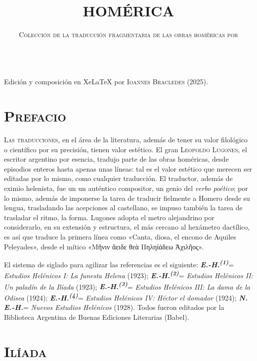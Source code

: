 \documentclass[11pt,twoside]{article}
\title{\huge\textbf{HOMÉRICA}}
\date{\vspace{40pt} \textsc{Colección de la traducción fragmentaria de las obras homéricas por}\\\vspace*{14pt}{\huge\textsc{\textbf{Leopoldo Lugones}}}\\\fontsize{40}{11}\selectfont{\vfill\textbf{\LaTeX}}}
\author{}
\newcommand{\ehuno}{\emph{\textbf{E.-H.\textsuperscript{(1)}}}}
\newcommand{\ehdos}{\emph{\textbf{E.-H.\textsuperscript{(2)}}}}
\newcommand{\ehter}{\emph{\textbf{E.-H.\textsuperscript{(3)}}}}
\newcommand{\ehctr}{\emph{\textbf{E.-H.\textsuperscript{(4)}}}}
\newcommand{\neh}{\emph{\textbf{N. E.-H.}}}
\begin{document}
{
	\maketitle
	}
\newpage
%
\null
\vfill
\begin{flushright}
	Edición y composición en XeLaTeX por \textsc{Ioannes Bracledes} (2025).
\end{flushright}
\newpage
%
\tableofcontents
\newpage
%
\setcounter{page}{1}
\section*{\centering\textsc{Prefacio}}
\par
%
\textsc{Las traducciones}, en el área de la literatura, además de tener su valor filológico o científico por su precisión, tienen valor estético. El gran \textsc{Leopoldo Lugones}, el escritor argentino por esencia, tradujo parte de las obras homéricas, desde episodios enteros hasta apenas unas líneas: tal es el valor estético que merecen ser editadas por lo mismo, como cualquier traducción. El traductor, además de eximio helenista, fue un un auténtico compositor, un genio del \emph{verbo poético}; por lo mismo, además de imponerse la tarea de traducir fielmente a Homero desde su lengua, trasladando las acepciones al castellano, se impuso también la tarea de trasladar el ritmo, la forma. Lugones adopta el metro alejandrino por considerarlo, en su extensión y estructura, el más cercano al hexámetro dactílico, es así que traduce la primera línea como «Canta, diosa, el encono de Aquiles Peleyades», desde el mítico «Μῆνιν ἄειδε θεὰ Πηληϊάδεω Ἀχιλῆος».\par
%
El sistema de siglado para agilizar las referencias es el siguiente: \ehuno = \emph{Estudios Helénicos I: La funesta Helena} (1923); \ehdos = \emph{Estudios Helénicos II: Un paladín de la Ilíada} (1923); \ehter = \emph{Estudios Helénicos III: La dama de la Odisea} (1924); \ehctr = \emph{Estudios Helénicos IV: Héctor el domador} (1924); \neh = \emph{Nuevos Estudios Helénicos} (1928). Todos fueron editados por la Biblioteca Argentina de Buenas Ediciones Literarias (Babel).\par
\newpage
%
\section*{\centering\huge\textsc{Ilíada}}
\newpage
%
\setcounter{page}{3}
\end{document}
